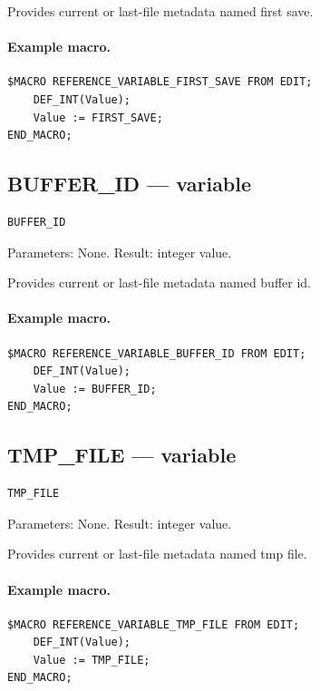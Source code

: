 \documentclass[a4paper,10pt,twoside,openany]{book}
\begin{document}
Provides current or last-file metadata named first save.

\paragraph{Example macro.}
\begin{verbatim}
$MACRO REFERENCE_VARIABLE_FIRST_SAVE FROM EDIT;
    DEF_INT(Value);
    Value := FIRST_SAVE;
END_MACRO;
\end{verbatim}

\label{prim:variable-buffer-id}
\subsection*{BUFFER\_ID --- variable}
\begin{verbatim}
BUFFER_ID
\end{verbatim}
Parameters: None. Result: integer value.

Provides current or last-file metadata named buffer id.

\paragraph{Example macro.}
\begin{verbatim}
$MACRO REFERENCE_VARIABLE_BUFFER_ID FROM EDIT;
    DEF_INT(Value);
    Value := BUFFER_ID;
END_MACRO;
\end{verbatim}

\label{prim:variable-tmp-file}
\subsection*{TMP\_FILE --- variable}
\begin{verbatim}
TMP_FILE
\end{verbatim}
Parameters: None. Result: integer value.

Provides current or last-file metadata named tmp file.

\paragraph{Example macro.}
\begin{verbatim}
$MACRO REFERENCE_VARIABLE_TMP_FILE FROM EDIT;
    DEF_INT(Value);
    Value := TMP_FILE;
END_MACRO;
\end{verbatim}
\end{document}

